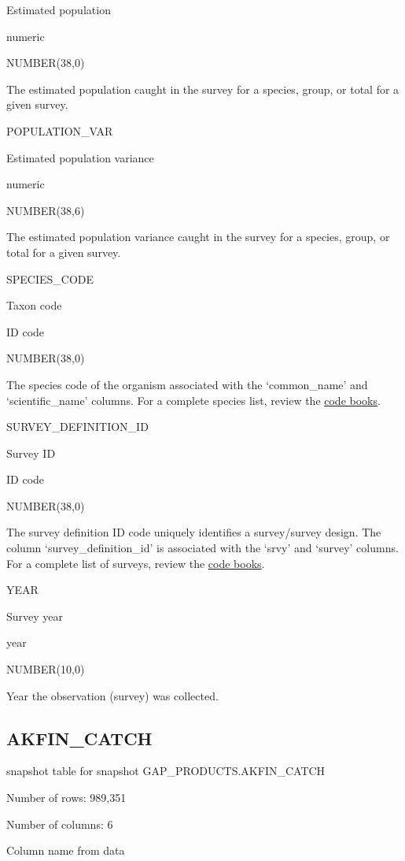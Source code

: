 \documentclass[
  letterpaper,
  oneside,
  open=any]{scrbook}
\begin{document}
Estimated population

numeric

NUMBER(38,0)

The estimated population caught in the survey for a species, group, or
total for a given survey.

POPULATION\_VAR

Estimated population variance

numeric

NUMBER(38,6)

The estimated population variance caught in the survey for a species,
group, or total for a given survey.

SPECIES\_CODE

Taxon code

ID code

NUMBER(38,0)

The species code of the organism associated with the `common\_name' and
`scientific\_name' columns. For a complete species list, review the
\href{https://www.fisheries.noaa.gov/resource/document/groundfish-survey-species-code-manual-and-data-codes-manual}{code
books}.

SURVEY\_DEFINITION\_ID

Survey ID

ID code

NUMBER(38,0)

The survey definition ID code uniquely identifies a survey/survey
design. The column `survey\_definition\_id' is associated with the
`srvy' and `survey' columns. For a complete list of surveys, review the
\href{https://www.fisheries.noaa.gov/resource/document/groundfish-survey-species-code-manual-and-data-codes-manual}{code
books}.

YEAR

Survey year

year

NUMBER(10,0)

Year the observation (survey) was collected.

\hypertarget{akfin_catch}{%
\subsection{AKFIN\_CATCH}\label{akfin_catch}}

snapshot table for snapshot GAP\_PRODUCTS.AKFIN\_CATCH

Number of rows: 989,351

Number of columns: 6

Column name from data
\end{document}
